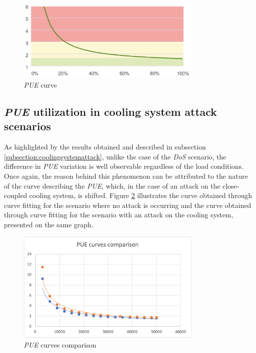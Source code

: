 \begin{figure}[h]
    \centering
    \includegraphics[width=0.8\textwidth]{chapters/images/pue_curve.png}
    \caption{\emph{PUE} curve}
    \label{fig:pue_curve}
\end{figure}

\subsection{\emph{PUE} utilization in cooling system attack scenarios}
As highlighted by the results obtained and described in subsection \ref{subsection:coolingsystemattack}, unlike the case of the \emph{DoS} scenario, the difference in \emph{PUE} variation is well observable regardless of the load conditions. Once again, the reason behind this phenomenon can be attributed to the nature of the curve describing the \emph{PUE}, which, in the case of an attack on the close-coupled cooling system, is shifted. Figure \ref{fig:pue_curves_comp} illustrates the curve obtained through curve fitting for the scenario where no attack is occurring and the curve obtained through curve fitting for the scenario with an attack on the cooling system, presented on the same graph.
\begin{figure}[h]
    \centering
    \includegraphics[width=0.8\textwidth]{chapters/images/pue_curves_comp.png}
    \caption{\emph{PUE} curves comparison}
    \label{fig:pue_curves_comp}
\end{figure}
